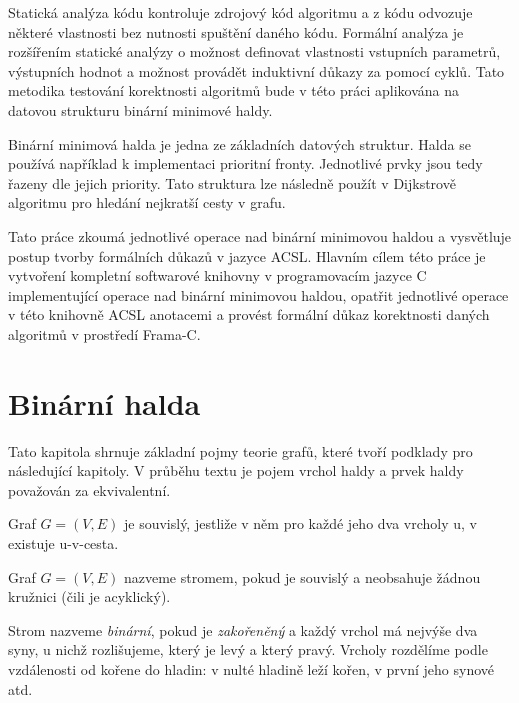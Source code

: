 Statická analýza kódu kontroluje zdrojový kód algoritmu a z kódu odvozuje některé vlastnosti bez nutnosti spuštění daného kódu. Formální analýza je rozšířením statické analýzy o možnost definovat vlastnosti vstupních parametrů, výstupních hodnot a možnost provádět induktivní důkazy za pomocí cyklů. Tato metodika testování korektnosti algoritmů bude v této práci aplikována na datovou strukturu binární minimové haldy.

Binární minimová halda je jedna ze základních datových struktur. Halda se používá například k implementaci prioritní fronty. Jednotlivé prvky jsou tedy řazeny dle jejich priority. Tato struktura lze následně použít v Dijkstrově algoritmu pro hledání nejkratší cesty v grafu.

Tato práce zkoumá jednotlivé operace nad binární minimovou haldou a vysvětluje postup tvorby formálních důkazů v jazyce ACSL. Hlavním cílem této práce je vytvoření kompletní softwarové knihovny v programovacím jazyce C implementující operace nad binární minimovou haldou, opatřit jednotlivé operace v této knihovně ACSL anotacemi a provést formální důkaz korektnosti daných algoritmů v prostředí Frama-C.

\chapter{Binární halda}

Tato kapitola shrnuje základní pojmy teorie grafů, které tvoří podklady pro následující kapitoly. V průběhu textu je pojem vrchol haldy a prvek haldy považován za ekvivalentní.

\begin{definition}
Graf $G = (V, E)$ je souvislý, jestliže v něm pro každé jeho dva vrcholy u, v existuje u-v-cesta.
\end{definition}

\begin{definition}[Strom]
Graf $G = (V, E)$ nazveme stromem, pokud je souvislý a neobsahuje žádnou kružnici (čili je acyklický).
\end{definition}

\begin{definition}
Strom nazveme \textit{binární}, pokud je \textit{zakořeněný} a každý vrchol má nejvýše dva
syny, u nichž rozlišujeme, který je levý a který pravý. Vrcholy rozdělíme podle vzdálenosti
od kořene do hladin: v nulté hladině leží kořen, v první jeho synové atd.
\end{definition}

